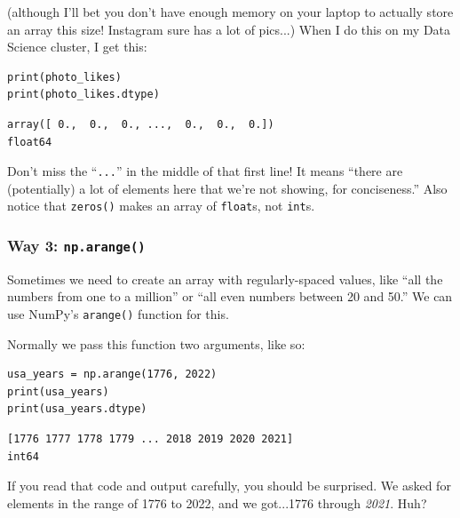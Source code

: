 (although I'll bet you don't have enough memory on your laptop to actually
store an array this size! Instagram sure has a lot of pics...) When I do this
on my Data Science cluster, I get this:

\begin{Verbatim}[fontsize=\small,samepage=true,frame=single,framesep=3mm]
print(photo_likes)
print(photo_likes.dtype)
\end{Verbatim}

\begin{Verbatim}[fontsize=\small,samepage=true,frame=leftline,framesep=5mm,framerule=1mm]
array([ 0.,  0.,  0., ...,  0.,  0.,  0.])
float64
\end{Verbatim}

Don't miss the ``\texttt{...}'' in the middle of that first line! It means
``there are (potentially) a lot of elements here that we're not showing, for
conciseness.'' Also notice that \texttt{zeros()} makes an array of
\texttt{float}s, not \texttt{int}s.


\subsubsection{Way 3: \texttt{np.arange()}}

Sometimes we need to create an array with regularly-spaced values, like ``all
the numbers from one to a million'' or ``all even numbers between 20 and 50.''
We can use NumPy's \texttt{arange()} function for this.

Normally we pass this function two arguments, like so:

\begin{Verbatim}[fontsize=\small,samepage=true,frame=single,framesep=3mm]
usa_years = np.arange(1776, 2022)
print(usa_years)
print(usa_years.dtype)
\end{Verbatim}

\begin{Verbatim}[fontsize=\small,samepage=true,frame=leftline,framesep=5mm,framerule=1mm]
[1776 1777 1778 1779 ... 2018 2019 2020 2021]
int64
\end{Verbatim}

If you read that code and output carefully, you should be surprised. We asked
for elements in the range of 1776 to 2022, and we got...1776 through
\textit{2021}. Huh?

\label{arangeNotIncludingLast}

